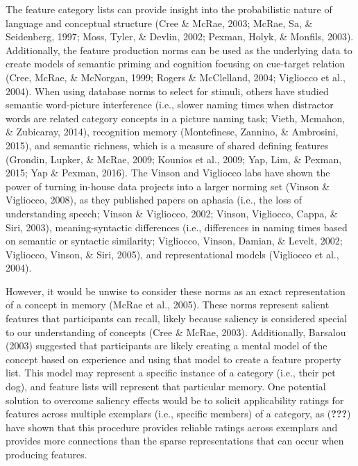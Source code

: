 \documentclass[english,,man]{apa6}
\theoremstyle{definition}
\theoremstyle{definition}
\theoremstyle{definition}
\theoremstyle{remark}
\begin{document}
The feature category lists can provide insight into the probabilistic
nature of language and conceptual structure (Cree \& McRae, 2003; McRae,
Sa, \& Seidenberg, 1997; Moss, Tyler, \& Devlin, 2002; Pexman, Holyk, \&
Monfils, 2003). Additionally, the feature production norms can be used
as the underlying data to create models of semantic priming and
cognition focusing on cue-target relation (Cree, McRae, \& McNorgan,
1999; Rogers \& McClelland, 2004; Vigliocco et al., 2004). When using
database norms to select for stimuli, others have studied semantic
word-picture interference (i.e., slower naming times when distractor
words are related category concepts in a picture naming task; Vieth,
Mcmahon, \& Zubicaray, 2014), recognition memory (Montefinese, Zannino,
\& Ambrosini, 2015), and semantic richness, which is a measure of shared
defining features (Grondin, Lupker, \& McRae, 2009; Kounios et al.,
2009; Yap, Lim, \& Pexman, 2015; Yap \& Pexman, 2016). The Vinson and
Vigliocco labs have shown the power of turning in-house data projects
into a larger norming set (Vinson \& Vigliocco, 2008), as they published
papers on aphasia (i.e., the loss of understanding speech; Vinson \&
Vigliocco, 2002; Vinson, Vigliocco, Cappa, \& Siri, 2003),
meaning-syntactic differences (i.e., differences in naming times based
on semantic or syntactic similarity; Vigliocco, Vinson, Damian, \&
Levelt, 2002; Vigliocco, Vinson, \& Siri, 2005), and representational
models (Vigliocco et al., 2004).

However, it would be unwise to consider these norms as an exact
representation of a concept in memory (McRae et al., 2005). These norms
represent salient features that participants can recall, likely because
saliency is considered special to our understanding of concepts (Cree \&
McRae, 2003). Additionally, Barsalou (2003) suggested that participants
are likely creating a mental model of the concept based on experience
and using that model to create a feature property list. This model may
represent a specific instance of a category (i.e., their pet dog), and
feature lists will represent that particular memory. One potential
solution to overcome saliency effects would be to solicit applicability
ratings for features across multiple exemplars (i.e., specific members)
of a category, as ({\textbf{???}}) have shown that this procedure
provides reliable ratings across exemplars and provides more connections
than the sparse representations that can occur when producing features.
\end{document}

